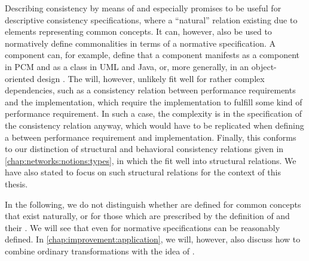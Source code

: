 Describing consistency by means of \commonalities and \conceptmetamodels especially promises to be useful for descriptive consistency specifications, where a \enquote{natural} relation existing due to elements representing common concepts.
It can, however, also be used to normatively define commonalities in terms of a normative specification.
A component \commonality can, for example, define that a component manifests as a component in \gls{PCM} and as a class in \gls{UML} and Java, or, more generally, in an object-oriented design \conceptmetamodel.
The will, however, unlikely fit well for rather complex dependencies, such as a consistency relation between performance requirements and the implementation, which require the implementation to fulfill some kind of performance requirement.
In such a case, the complexity is in the specification of the consistency relation anyway, which would have to be replicated when defining a \commonality between performance requirement and implementation.
Finally, this conforms to our distinction of structural and behavioral consistency relations given in \autoref{chap:networks:notions:types}, in which the \commonalities fit well into structural relations.
We have also stated to focus on such structural relations for the context of this thesis.

In the following, we do not distinguish whether \commonalities are defined for common concepts that exist naturally, or for those which are prescribed by the definition of \conceptmetamodels and their \commonalities.
We will see that even for normative specifications \commonalities can be reasonably defined.
In \autoref{chap:improvement:application}, we will, however, also discuss how to combine ordinary transformations with the idea of \conceptmetamodels.





